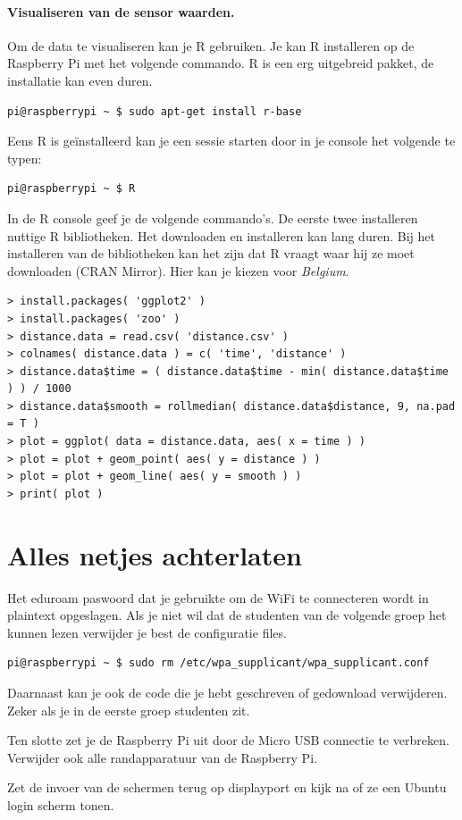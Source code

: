 \documentclass[a4paper]{article}
\begin{document}
  
  \paragraph{Visualiseren van de sensor waarden.}  Om de data te
visualiseren kan je R gebruiken.  Je kan R installeren op de Raspberry
Pi met het volgende commando.  R is een erg uitgebreid pakket, de
installatie kan even duren.
\begin{lstlisting}
pi@raspberrypi ~ $ sudo apt-get install r-base
\end{lstlisting}

  Eens R is ge\"installeerd kan je een sessie starten door in je
console het volgende te typen:
\begin{lstlisting}
pi@raspberrypi ~ $ R
\end{lstlisting}

  In de R console geef je de volgende commando's.  De eerste twee
installeren nuttige R bibliotheken.  Het downloaden en installeren kan
lang duren.  Bij het installeren van de bibliotheken kan het zijn dat
R vraagt waar hij ze moet downloaden (CRAN Mirror).  Hier kan je
kiezen voor \emph{Belgium}.
\begin{lstlisting}
> install.packages( 'ggplot2' )
> install.packages( 'zoo' )
> distance.data = read.csv( 'distance.csv' )
> colnames( distance.data ) = c( 'time', 'distance' )
> distance.data$time = ( distance.data$time - min( distance.data$time ) ) / 1000
> distance.data$smooth = rollmedian( distance.data$distance, 9, na.pad = T )
> plot = ggplot( data = distance.data, aes( x = time ) )
> plot = plot + geom_point( aes( y = distance ) )
> plot = plot + geom_line( aes( y = smooth ) )
> print( plot )
\end{lstlisting}

\section{Alles netjes achterlaten}\label{sec:opruimen}

Het eduroam paswoord dat je gebruikte om de WiFi te connecteren wordt
in plaintext opgeslagen.  Als je niet wil dat de studenten van de
volgende groep het kunnen lezen verwijder je best de configuratie
files.

\begin{lstlisting}
pi@raspberrypi ~ $ sudo rm /etc/wpa_supplicant/wpa_supplicant.conf
\end{lstlisting}

Daarnaast kan je ook de code die je hebt geschreven of gedownload
verwijderen.  Zeker als je in de eerste groep studenten zit.

Ten slotte zet je de Raspberry Pi uit door de Micro USB connectie te
verbreken.  Verwijder ook alle randapparatuur van de Raspberry Pi.

Zet de invoer van de schermen terug op displayport en kijk na of ze
een Ubuntu login scherm tonen.
\end{document}
